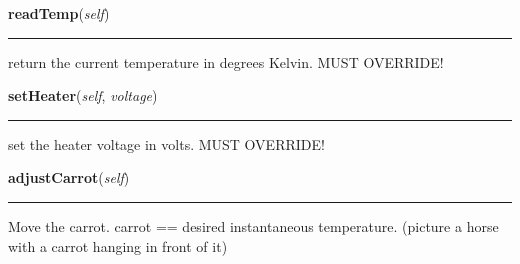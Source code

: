     \label{tempcontrol:tcontroller:readTemp}

    \vspace{0.5ex}

    \begin{boxedminipage}{\textwidth}

    \raggedright \textbf{readTemp}(\textit{self})

    \vspace{-1.5ex}

    \rule{\textwidth}{0.5\fboxrule}
    return the current temperature in degrees Kelvin. MUST OVERRIDE!

    \vspace{1ex}

    \end{boxedminipage}

    \label{tempcontrol:tcontroller:setHeater}

    \vspace{0.5ex}

    \begin{boxedminipage}{\textwidth}

    \raggedright \textbf{setHeater}(\textit{self}, \textit{voltage})

    \vspace{-1.5ex}

    \rule{\textwidth}{0.5\fboxrule}
    set the heater voltage in volts. MUST OVERRIDE!

    \vspace{1ex}

    \end{boxedminipage}

    \label{tempcontrol:tcontroller:adjustCarrot}

    \vspace{0.5ex}

    \begin{boxedminipage}{\textwidth}

    \raggedright \textbf{adjustCarrot}(\textit{self})

    \vspace{-1.5ex}

    \rule{\textwidth}{0.5\fboxrule}
    Move the carrot. carrot == desired instantaneous temperature. (picture 
    a horse with a carrot hanging in front of it)

    \vspace{1ex}

    \end{boxedminipage}

